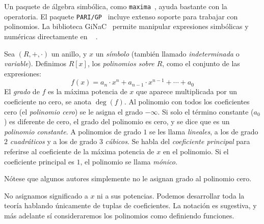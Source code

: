   Un paquete de álgebra simbólica,%
  como \texttt{maxima}~\cite{maxima14b:_computer_algebra},%
  ayuda bastante con la operatoria.
  El paquete \texttt{PARI/GP}~\cite{PARI:2.7.2}%
  incluye extenso soporte para trabajar con polinomios.
  La biblioteca GiNaC~%
    \cite{bauer02:_ginac_fram_symbol_comput, GiNaC:1.6.2}%
  permite manipular expresiones simbólicas y numéricas
  directamente en \cplusplus~%
    \cite{ISO11:_C++, stroustrup00:_C++_progr_languag}.%
  \begin{definition}
    \label{def:ring-polynomials}
    Sea \((R, +, \cdot)\) un anillo,
    y \(x\) un \emph{símbolo}
    (también llamado \emph{indeterminada} o \emph{variable}).
    Definimos \(R[x]\),
    los \emph{polinomios sobre \(R\)},
    como el conjunto de las expresiones:
    \begin{equation*}
      f(x)
	= a_n \cdot x^n + a_{n - 1} \cdot x^{n - 1} + \dotsb + a_0
    \end{equation*}
    El \emph{grado} de \(f\) es la máxima potencia de \(x\)
    que aparece multiplicada por un coeficiente no cero,
    se anota \(\deg(f)\).
    Al polinomio con todos los coeficientes cero
    (el \emph{polinomio cero})
    se le asigna el grado \(-\infty\).
    Si solo el término constante (\(a_0\)) es diferente de cero,
    el grado del polinomio es cero,
    y se dice que es un \emph{polinomio constante}.%
    A polinomios de grado \(1\) se les llama \emph{lineales},%
    a los de grado \(2\) \emph{cuadráticos}%
    y a los de grado \(3\) \emph{cúbicos}.%
    Se habla del \emph{coeficiente principal}%
    para referirse al coeficiente
    de la máxima potencia de \(x\) en el polinomio.
    Si el coeficiente principal es \(1\),
    el polinomio se llama \emph{mónico}.%
  \end{definition}
  Nótese que algunos autores
  simplemente no le asignan grado al polinomio cero.

  No asignamos significado a \(x\) ni a sus potencias.
  Podemos desarrollar toda la teoría
  hablando únicamente de tuplas de coeficientes.
  La notación es sugestiva,
  y más adelante sí consideraremos
  los polinomios como definiendo funciones.

